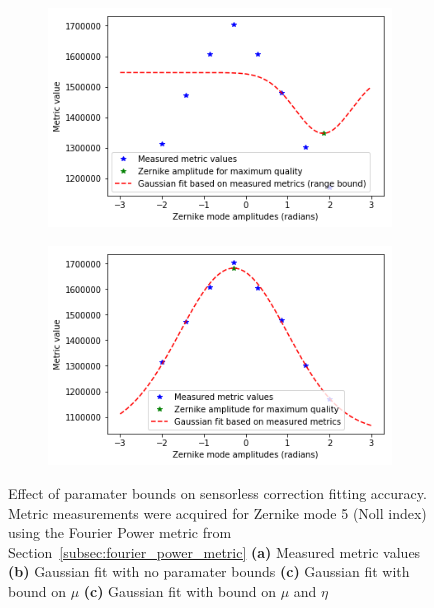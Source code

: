 \begin{figure}[h]
	\begin{subfigure}{0.48\textwidth}
		\centering
		\includegraphics[width=\linewidth]{images/zernike_fitting_current_power_metric_range_bound_2.png}
		\caption{}
		\label{fig:zernike_fitting_current_power_metric_range_bound_2}
	\end{subfigure}
	\begin{subfigure}{0.48\textwidth}
		\centering
		\includegraphics[width=\linewidth]{images/zernike_fitting_current_power_metric_bound_2.png}
		\caption{}
		\label{fig:zernike_fitting_current_power_metric_bound_2}
	\end{subfigure}
	\caption[Effect of paramater bounds on sensorless correction fitting accuracy]{Effect of paramater bounds on sensorless correction fitting accuracy. Metric measurements were acquired for Zernike mode 5 (Noll index) using the Fourier Power metric from Section~\ref{subsec:fourier_power_metric} \textbf{(a)} Measured metric values \textbf{(b)} Gaussian fit with no paramater bounds \textbf{(c)} Gaussian fit with bound on $\mu$ \textbf{(c)} Gaussian fit with bound on $\mu$ and $\eta$}
	\label{fig:sensorless_fitting_accuracy}
\end{figure}

